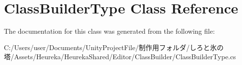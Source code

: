 \hypertarget{class_class_builder_type}{}\section{Class\+Builder\+Type Class Reference}
\label{class_class_builder_type}


The documentation for this class was generated from the following file\+:\begin{DoxyCompactItemize}
\item 
C\+:/\+Users/user/\+Documents/\+Unity\+Project\+File/制作用フォルダ/しろと氷の塔/\+Assets/\+Heureka/\+Heureka\+Shared/\+Editor/\+Class\+Builder/Class\+Builder\+Type.\+cs\end{DoxyCompactItemize}
